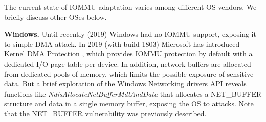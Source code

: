 
The current state of IOMMU adaptation varies among different OS vendors. We briefly discuss other OSes below.

\smallskip
\noindent\textbf{Windows.} Until recently (2019) Windows had no IOMMU support, exposing it to simple DMA attack.
In 2019 (with build 1803) Microsoft has introduced Kernel DMA Protection \cite{ms_iommu}, which provides IOMMU protection by default with a dedicated I/O page table per device. 
In addition, network buffers are allocated from dedicated pools of memory, which limits the possible exposure of sensitive data. But a brief exploration of the Windows Networking drivers API reveals functions like \emph{NdisAllocateNetBufferMdlAndData} \cite{ms_single} that allocates a NET\_BUFFER structure and data in a single memory buffer, exposing the OS to \simple attacks. 
Note that the NET\_BUFFER vulnerability was previously described\cite{thunder}. 


